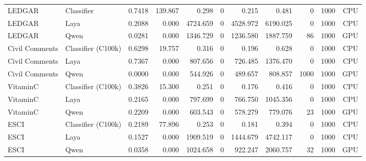\begin{table}[htbp]
\begin{tabular}{@{}llrrrrrrrrr@{}}
LEDGAR & Classifier & 0.7418 & 139.867 & 0.298 & 0 & 0.215 & 0.481 & 0 & 1000 & CPU \\
LEDGAR & Laya & 0.2088 & 0.000 & 4724.659 & 0 & 4528.972 & 6190.025 & 0 & 1000 & CPU \\
LEDGAR & Qwen & 0.0281 & 0.000 & 1346.729 & 0 & 1236.580 & 1887.759 & 86 & 1000 & GPU \\
Civil Comments & Classifier (C100k) & 0.6298 & 19.757 & 0.316 & 0 & 0.196 & 0.628 & 0 & 1000 & CPU \\
Civil Comments & Laya & 0.7367 & 0.000 & 807.656 & 0 & 726.485 & 1376.470 & 0 & 1000 & CPU \\
Civil Comments & Qwen & 0.0000 & 0.000 & 544.926 & 0 & 489.657 & 808.857 & 1000 & 1000 & GPU \\
VitaminC & Classifier (C100k) & 0.3826 & 15.300 & 0.251 & 0 & 0.176 & 0.416 & 0 & 1000 & CPU \\
VitaminC & Laya & 0.2165 & 0.000 & 797.699 & 0 & 766.750 & 1045.356 & 0 & 1000 & CPU \\
VitaminC & Qwen & 0.2209 & 0.000 & 603.543 & 0 & 578.279 & 779.076 & 23 & 1000 & GPU \\
ESCI & Classifier (C100k) & 0.2189 & 77.896 & 0.253 & 0 & 0.181 & 0.394 & 0 & 1000 & CPU \\
ESCI & Laya & 0.1527 & 0.000 & 1909.519 & 0 & 1444.679 & 4742.117 & 0 & 1000 & CPU \\
ESCI & Qwen & 0.0358 & 0.000 & 1024.658 & 0 & 922.247 & 2060.757 & 32 & 1000 & GPU \\
\bottomrule
\end{tabular}
\end{table}
